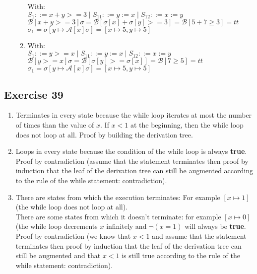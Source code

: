 \documentclass[12pt,fleqn]{article}		%
\begin{document}
\begin{enumerate}
\begin{enumerate}
\begin{prooftree}
\end{prooftree}
With:\\
$ S_1 ::= x+y>=3 \mid S_{11} ::= y := x \mid S_{12} ::= x := y $\\
$ \mathcal{B}[x+y>=3]\sigma = \mathcal{B}[\sigma[x] + \sigma[y] >= 3] = \mathcal{B}[5 + 7 \geq 3] = tt$\\
$ \sigma_1 = \sigma[y \mapsto \mathcal{A}[x]\sigma] = [x \mapsto 5, y \mapsto 5] $
\item
\begin{prooftree}
\end{prooftree}
With:\\
$ S_1 ::= y>=x \mid S_{11} ::= y := x \mid S_{12} ::= x := y $\\
$ \mathcal{B}[y>=x]\sigma = \mathcal{B}[\sigma[y] >= \sigma[x]] = \mathcal{B}[7 \geq 5] = tt$\\
$ \sigma_1 = \sigma[y \mapsto \mathcal{A}[x]\sigma] = [x \mapsto 5, y \mapsto 5] $
\end{enumerate}
\end{enumerate}

\subsection{Exercise 39}
\begin{enumerate}
\item Terminates in every state because the while loop iterates at most the number of times than the value of $ x $. If $ x < 1 $ at the beginning, then the while loop does not loop at all. Proof by building the derivation tree.
\item Loops in every state because the condition of the while loop is always \textbf{true}. Proof by contradiction (assume that the statement terminates then proof by induction that the leaf of the derivation tree can still be augmented according to the rule of the while statement: contradiction).
\item There are states from which the execution terminates: For example $ [x \mapsto 1] $ (the while loop does not loop at all).\\
There are some states from which it doesn't terminate: for example $ [x \mapsto 0] $ (the while loop decrements $ x $ infinitely and $ \lnot(x = 1) $ will always be \textbf{true}. Proof by contradiction (we know that $ x < 1 $ and assume that the statement terminates then proof by induction that the leaf of the derivation tree can still be augmented and that $ x < 1 $ is still true according to the rule of the while statement: contradiction).
\end{enumerate}
\end{document}

